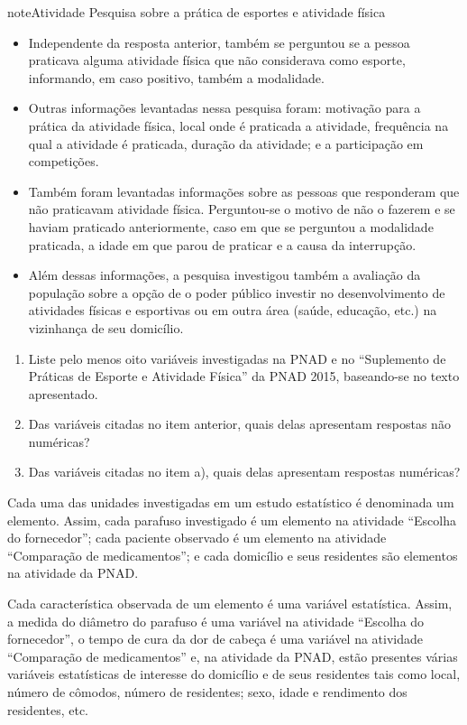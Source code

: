 \begin{sphinxadmonition}{note}{Atividade}{ Pesquisa sobre a prática de esportes e atividade física}
\begin{itemize}
\item {} 
Independente da resposta anterior, também se perguntou se a pessoa praticava alguma atividade física que não considerava como esporte, informando, em caso positivo, também a modalidade.

\item {} 
Outras informações levantadas nessa pesquisa foram: motivação para a prática da atividade física, local onde é praticada a atividade, frequência na qual a atividade é praticada, duração da atividade; e a participação em competições.

\item {} 
Também foram levantadas informações sobre as pessoas que responderam que não praticavam atividade física. Perguntou-se o motivo de não o fazerem e se haviam praticado anteriormente, caso em que se perguntou a modalidade praticada, a idade em que parou de praticar e a causa da interrupção.

\item {} 
Além dessas informações, a pesquisa investigou também a avaliação da população sobre a opção de o poder público investir no desenvolvimento de atividades físicas e esportivas ou em outra área (saúde, educação, etc.) na vizinhança de seu domicílio.

\end{itemize}
\begin{enumerate}
\item {} 
Liste pelo menos oito variáveis investigadas na PNAD e no ``Suplemento de Práticas de Esporte e Atividade Física'' da PNAD 2015, baseando-se no texto apresentado.

\item {} 
Das variáveis citadas no item anterior, quais delas apresentam respostas não numéricas?

\item {} 
Das variáveis citadas no item a), quais delas apresentam respostas numéricas?

\end{enumerate}

Cada uma das unidades investigadas em um estudo estatístico é denominada um elemento.  Assim, cada parafuso investigado é um elemento na atividade ``Escolha do fornecedor''; cada paciente observado é um elemento na atividade ``Comparação de medicamentos''; e cada domicílio e seus residentes são elementos na atividade da PNAD.

Cada característica observada de um elemento é uma variável estatística. Assim, a medida do diâmetro do parafuso é uma variável na atividade ``Escolha do fornecedor'', o tempo de cura da dor de cabeça é uma variável na atividade ``Comparação de medicamentos'' e, na atividade da PNAD, estão presentes várias variáveis estatísticas de interesse do domicílio e de seus residentes tais como local, número de cômodos, número de residentes; sexo, idade e rendimento dos residentes, etc.
\end{sphinxadmonition}

